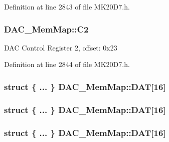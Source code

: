 Definition at line 2843 of file M\+K20\+D7.\+h.

\subsubsection[{\texorpdfstring{C2}{C2}}]{ D\+A\+C\+\_\+\+Mem\+Map\+::\+C2}\hypertarget{struct_d_a_c___mem_map_a8c2e7ea3f41f7b867578fdec48b4dacc}{}\label{struct_d_a_c___mem_map_a8c2e7ea3f41f7b867578fdec48b4dacc}
D\+AC Control Register 2, offset\+: 0x23 

Definition at line 2844 of file M\+K20\+D7.\+h.

\subsubsection[{\texorpdfstring{D\+AT}{DAT}}]{\setlength{\rightskip}{0pt plus 5cm}struct \{ ... \}   D\+A\+C\+\_\+\+Mem\+Map\+::\+D\+AT\mbox{[}16\mbox{]}}\hypertarget{struct_d_a_c___mem_map_a99438365534b1317e59b49be22b12564}{}\label{struct_d_a_c___mem_map_a99438365534b1317e59b49be22b12564}
\subsubsection[{\texorpdfstring{D\+AT}{DAT}}]{\setlength{\rightskip}{0pt plus 5cm}struct \{ ... \}   D\+A\+C\+\_\+\+Mem\+Map\+::\+D\+AT\mbox{[}16\mbox{]}}\hypertarget{struct_d_a_c___mem_map_a62b764c69e5c2c5e1f9e288308c52846}{}\label{struct_d_a_c___mem_map_a62b764c69e5c2c5e1f9e288308c52846}
\subsubsection[{\texorpdfstring{D\+AT}{DAT}}]{\setlength{\rightskip}{0pt plus 5cm}struct \{ ... \}   D\+A\+C\+\_\+\+Mem\+Map\+::\+D\+AT\mbox{[}16\mbox{]}}\hypertarget{struct_d_a_c___mem_map_a3e6f2f500e67b2b01e2a551dbcdd0497}{}\label{struct_d_a_c___mem_map_a3e6f2f500e67b2b01e2a551dbcdd0497}
